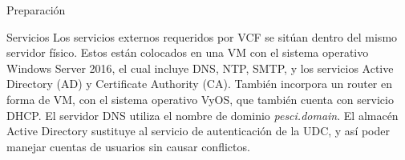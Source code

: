 \begin{subsection}{Preparación}
  \begin{subsubsection}{Servicios}
    Los servicios externos requeridos por VCF se sitúan dentro del mismo servidor físico. Estos están colocados en una VM con el sistema operativo Windows Server 2016, el cual incluye DNS, NTP, SMTP, y los servicios Active Directory (AD) y Certificate Authority (CA). También incorpora un router en forma de VM, con el sistema operativo VyOS, que también cuenta con servicio DHCP. El servidor DNS utiliza el nombre de dominio \textit{pesci.domain}. El almacén Active Directory sustituye al servicio de autenticación de la UDC, y así poder manejar cuentas de usuarios sin causar conflictos. 
  \end{subsubsection}


\end{subsection}
